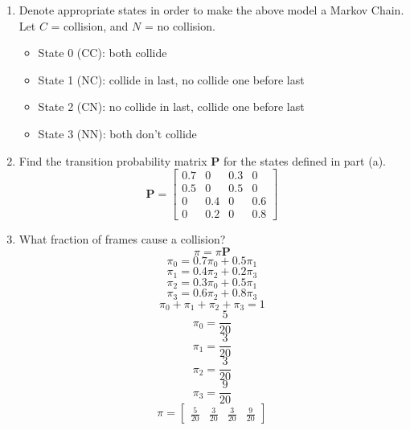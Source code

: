 \documentclass[10.5pt,letterpaper]{article}
\begin{document}
\begin{enumerate}[label=\textbf{Problem \arabic*.}]
	\begin{enumerate}[label=\alph*)]
	\item Denote appropriate states in order to make the above model a Markov Chain.\\
	Let $C$ = collision, and $N$ = no collision.
		\begin{itemize}
			\item State 0 (CC): both collide
			\item State 1 (NC): collide in last, no collide one before last
			\item State 2 (CN): no collide in last, collide one before last
			\item State 3 (NN): both don't collide 
		\end{itemize}
	\item Find the transition probability matrix \textbf{P} for the states defined in part (a).
	\[\boxed{\textbf{P} = \begin{bmatrix}
	0.7 & 0 & 0.3 & 0 \\
	0.5 & 0 & 0.5 & 0 \\
	0 & 0.4 & 0 & 0.6 \\
	0 & 0.2 & 0 & 0.8
	\end{bmatrix}}\]
	\item What fraction of frames cause a collision?
	\[\pi = \pi \textbf{P}\]
	\[\pi_0 = 0.7\pi_0 + 0.5\pi_1\]
	\[\pi_1 = 0.4\pi_2 + 0.2\pi_3\]
	\[\pi_2 = 0.3\pi_0 + 0.5\pi_1\]
	\[\pi_3 = 0.6\pi_2 + 0.8\pi_3\]
	\[\pi_0 + \pi_1 + \pi_2 + \pi_3 = 1\]
	\[\pi_0 = \frac{5}{20}\]
	\[\pi_1 = \frac{3}{20}\]
	\[\pi_2 = \frac{3}{20}\]
	\[\pi_3 = \frac{9}{20}\]
	\[\boxed{
		\pi = 
		\begin{bmatrix}
		\frac{5}{20} & 
		\frac{3}{20} & 
		\frac{3}{20} & 
		\frac{9}{20}
		\end{bmatrix}}\]
	\end{enumerate}
\end{enumerate}
\end{document}
